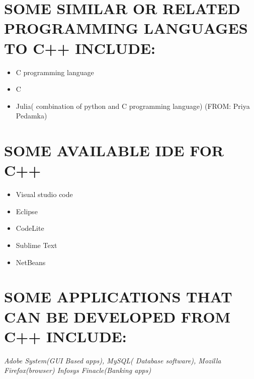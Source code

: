 \documentclass{article}
\begin{document}
	\section{SOME SIMILAR OR RELATED PROGRAMMING LANGUAGES TO C++ INCLUDE:}

	\begin{itemize}
    \item C programming language
	\item C
	\item Julia( combination of python and C programming language) (FROM: Priya Pedamka) \end{itemize}
	\section{SOME AVAILABLE IDE FOR C++}
	\begin{itemize}
	\item Visual studio code
	\item Eclipse
    \item 	CodeLite
	\item Sublime Text
    \item	NetBeans
    \end{itemize}
	\section{SOME APPLICATIONS THAT CAN BE DEVELOPED FROM C++ INCLUDE:}
\emph{Adobe System(GUI Based apps), MySQL( Database software), Mozilla Firefox(browser) Infosys Finacle(Banking apps)}
	
\end{document}
